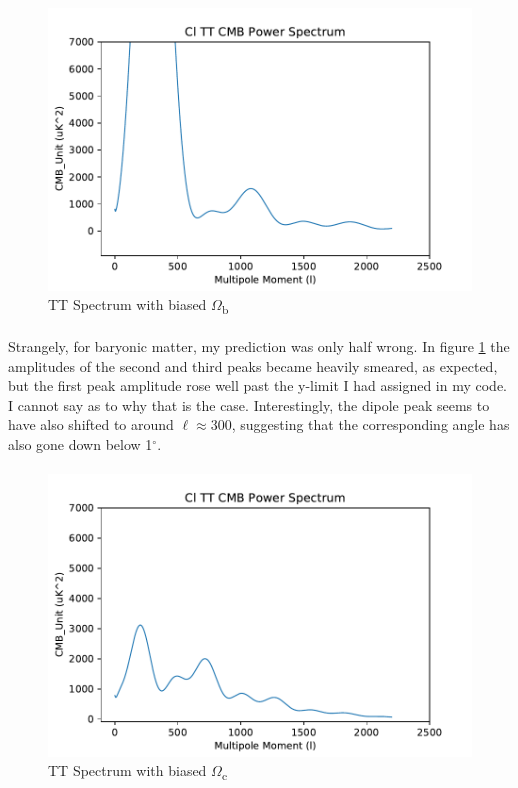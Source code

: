 \documentclass[twoside, fontsize=12pt,
     bibliography=totoc, %
     listof=totoc, %
     index=totoc, %
     onehalfspacing %
]{_MScDiss2017_cls}
\begin{document}
\begin{figure}[t]
	\begin{center}
	\includegraphics{3Cl-TT-vs-l}
	\caption{TT Spectrum with biased $\Omega$\textsubscript{b}}
	\label{fig:bbias}
	\end{center}
\end{figure}

\paragraph{}

Strangely, for baryonic matter, my prediction was only half wrong. In figure \ref{fig:bbias} the amplitudes of the second and third peaks became heavily smeared, as expected, but the first peak amplitude rose well past the y-limit I had assigned in my code. I cannot say as to why that is the case. Interestingly, the dipole peak seems to have also shifted to around $\ell$$\approx$300, suggesting that the corresponding angle has also gone down below 1$^\circ$.

\paragraph{}

\begin{figure}
	\begin{center}
	\includegraphics{4Cl-TT-vs-l}
	\caption{TT Spectrum with biased $\Omega$\textsubscript{c}}
	\label{fig:cbias}
	\end{center}
\end{figure}
\end{document}
